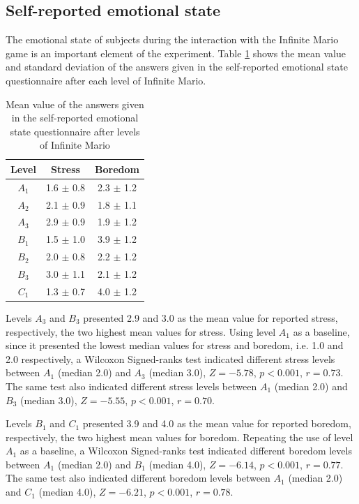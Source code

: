 \subsection{Self-reported emotional state}

The emotional state of subjects during the interaction with the Infinite Mario game is an important element of the experiment. Table \ref{table:experiment2-mario-emotions} shows the mean value and standard deviation of the answers given in the self-reported emotional state questionnaire after each level of Infinite Mario.

\begin{table}[!htbp]
  \centering
  \caption{Mean value of the answers given in the self-reported emotional state questionnaire after levels of Infinite Mario}
  \label{table:experiment2-mario-emotions}
  \begin{tabular}{ccc}
    \toprule%
      \textbf{Level} & \textbf{Stress} & \textbf{Boredom} \\
    \midrule%
      $A_1$ & 1.6 $\pm$ 0.8 & 2.3 $\pm$ 1.2 \\
      $A_2$ & 2.1 $\pm$ 0.9 & 1.8 $\pm$ 1.1 \\
      $A_3$ & 2.9 $\pm$ 0.9 & 1.9 $\pm$ 1.2 \\
      $B_1$ & 1.5 $\pm$ 1.0 & 3.9 $\pm$ 1.2 \\
      $B_2$ & 2.0 $\pm$ 0.8 & 2.2 $\pm$ 1.2 \\
      $B_3$ & 3.0 $\pm$ 1.1 & 2.1 $\pm$ 1.2 \\
      $C_1$ & 1.3 $\pm$ 0.7 & 4.0 $\pm$ 1.2 \\
    \bottomrule%
  \end{tabular}
\end{table}

Levels $A_3$ and $B_3$ presented 2.9 and 3.0 as the mean value for reported stress, respectively, the two highest mean values for stress. Using level $A_1$ as a baseline, since it presented the lowest median values for stress and boredom, i.e. 1.0 and 2.0 respectively, a Wilcoxon Signed-ranks test indicated different stress levels between $A_1$ (median 2.0) and $A_3$ (median 3.0), $Z=-5.78$, $p < 0.001$, $r=0.73$. The same test also indicated different stress levels between $A_1$ (median 2.0) and $B_3$ (median 3.0), $Z=-5.55$, $p < 0.001$, $r=0.70$.

Levels $B_1$ and $C_1$ presented 3.9 and 4.0 as the mean value for reported boredom, respectively, the two highest mean values for boredom. Repeating the use of level $A_1$ as a baseline, a Wilcoxon Signed-ranks test indicated different boredom levels between $A_1$ (median 2.0) and $B_1$ (median 4.0), $Z=-6.14$, $p < 0.001$, $r=0.77$. The same test also indicated different boredom levels between $A_1$ (median 2.0) and $C_1$ (median 4.0), $Z=-6.21$, $p < 0.001$, $r=0.78$.

